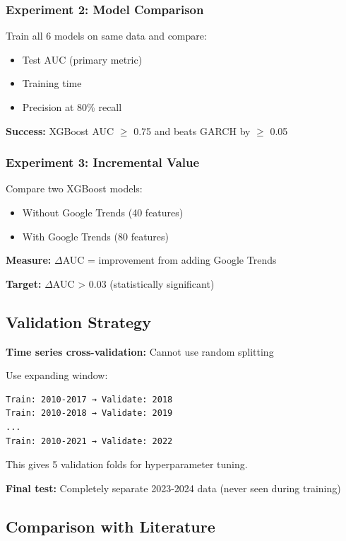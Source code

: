 \documentclass[12pt,a4paper]{article}
\begin{document}
\subsubsection{Experiment 2: Model Comparison}

Train all 6 models on same data and compare:
\begin{itemize}
    \item Test AUC (primary metric)
    \item Training time
    \item Precision at 80\% recall
\end{itemize}

\textbf{Success:} XGBoost AUC $\geq$ 0.75 and beats GARCH by $\geq$ 0.05

\subsubsection{Experiment 3: Incremental Value}

Compare two XGBoost models:
\begin{itemize}
    \item Without Google Trends (40 features)
    \item With Google Trends (80 features)
\end{itemize}

\textbf{Measure:} $\Delta$AUC = improvement from adding Google Trends

\textbf{Target:} $\Delta$AUC > 0.03 (statistically significant)

\subsection{Validation Strategy}

\textbf{Time series cross-validation:} Cannot use random splitting

Use expanding window:
\begin{verbatim}
Train: 2010-2017 → Validate: 2018
Train: 2010-2018 → Validate: 2019
...
Train: 2010-2021 → Validate: 2022
\end{verbatim}

This gives 5 validation folds for hyperparameter tuning.

\textbf{Final test:} Completely separate 2023-2024 data (never seen during training)

\subsection{Comparison with Literature}
\end{document}

